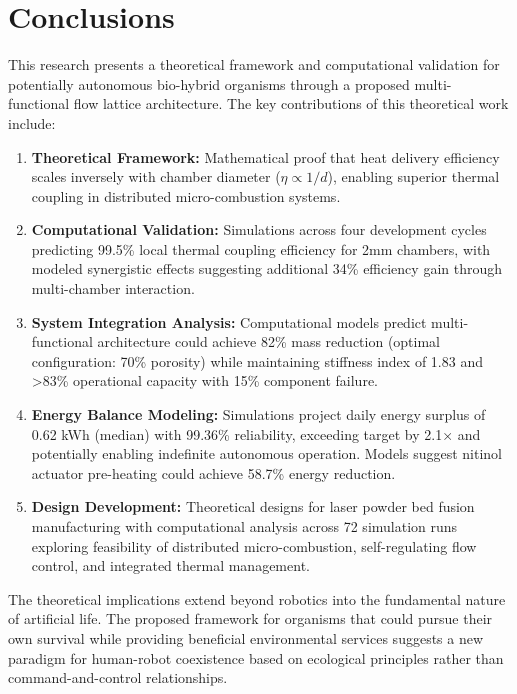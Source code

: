 \section{Conclusions}
\label{sec:conclusions}

This research presents a theoretical framework and computational validation for potentially autonomous bio-hybrid organisms through a proposed multi-functional flow lattice architecture. The key contributions of this theoretical work include:

\begin{enumerate}
    \item \textbf{Theoretical Framework:} Mathematical proof that heat delivery efficiency scales inversely with chamber diameter ($\eta \propto 1/d$), enabling superior thermal coupling in distributed micro-combustion systems.
    
    \item \textbf{Computational Validation:} Simulations across four development cycles predicting 99.5\% local thermal coupling efficiency for 2mm chambers, with modeled synergistic effects suggesting additional 34\% efficiency gain through multi-chamber interaction.
    
    \item \textbf{System Integration Analysis:} Computational models predict multi-functional architecture could achieve 82\% mass reduction (optimal configuration: 70\% porosity) while maintaining stiffness index of 1.83 and >83\% operational capacity with 15\% component failure.
    
    \item \textbf{Energy Balance Modeling:} Simulations project daily energy surplus of 0.62 kWh (median) with 99.36\% reliability, exceeding target by 2.1× and potentially enabling indefinite autonomous operation. Models suggest nitinol actuator pre-heating could achieve 58.7\% energy reduction.
    
    \item \textbf{Design Development:} Theoretical designs for laser powder bed fusion manufacturing with computational analysis across 72 simulation runs exploring feasibility of distributed micro-combustion, self-regulating flow control, and integrated thermal management.
\end{enumerate}

The theoretical implications extend beyond robotics into the fundamental nature of artificial life. The proposed framework for organisms that could pursue their own survival while providing beneficial environmental services suggests a new paradigm for human-robot coexistence based on ecological principles rather than command-and-control relationships.

